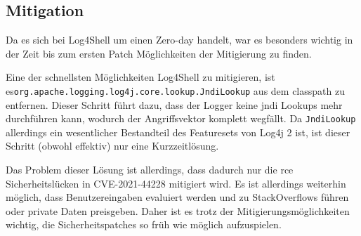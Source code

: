 
\subsection{Mitigation}\label{subsec:mitigation}
Da es sich bei Log4Shell um einen Zero-day handelt, war es besonders wichtig in der Zeit bis zum ersten Patch Möglichkeiten der Mitigierung zu finden.

Eine der schnellsten Möglichkeiten Log4Shell zu mitigieren, ist es\newline \verb|org.apache.logging.log4j.core.lookup.JndiLookup|\newline
aus dem classpath zu entfernen.
Dieser Schritt führt dazu, dass der Logger keine \gls{jndi} Lookups mehr durchführen kann, wodurch der Angriffsvektor komplett wegfällt.
Da \verb|JndiLookup| allerdings ein wesentlicher Bestandteil des Featuresets von Log4j 2 ist, ist dieser Schritt (obwohl effektiv) nur eine Kurzzeitlösung.

Das Problem dieser Lösung ist allerdings, dass dadurch nur die \gls{rce} Sicherheitslücken in CVE-2021-44228 mitigiert wird.
Es ist allerdings weiterhin möglich, dass Benutzereingaben evaluiert werden und zu StackOverflows führen oder private Daten preisgeben.
Daher ist es trotz der Mitigierungsmöglichkeiten wichtig, die Sicherheitspatches so früh wie möglich aufzuspielen.
